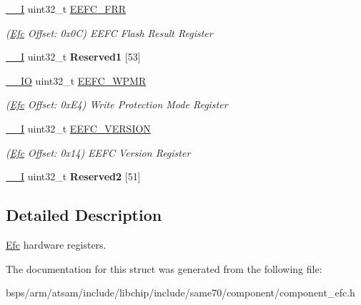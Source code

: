 \begin{DoxyCompactItemize}
\mbox{\label{structEfc_a82c4cb433e72e8bbd32412d06a09beb8}} 
\mbox{\hyperlink{core__cm7_8h_af63697ed9952cc71e1225efe205f6cd3}{\+\_\+\+\_\+I}} uint32\+\_\+t \mbox{\hyperlink{structEfc_a82c4cb433e72e8bbd32412d06a09beb8}{E\+E\+F\+C\+\_\+\+F\+RR}}
\begin{DoxyCompactList}\small\item\em (\mbox{\hyperlink{structEfc}{Efc}} Offset\+: 0x0C) E\+E\+FC Flash Result Register \end{DoxyCompactList}\item 
\mbox{\label{structEfc_a5a67048ca34a108a238d97ef9420f9e2}} 
\mbox{\hyperlink{core__cm7_8h_af63697ed9952cc71e1225efe205f6cd3}{\+\_\+\+\_\+I}} uint32\+\_\+t {\bfseries Reserved1} \mbox{[}53\mbox{]}
\item 
\mbox{\label{structEfc_a84e499108c143fc119dc46fab3ebae5f}} 
\mbox{\hyperlink{core__cm7_8h_aec43007d9998a0a0e01faede4133d6be}{\+\_\+\+\_\+\+IO}} uint32\+\_\+t \mbox{\hyperlink{structEfc_a84e499108c143fc119dc46fab3ebae5f}{E\+E\+F\+C\+\_\+\+W\+P\+MR}}
\begin{DoxyCompactList}\small\item\em (\mbox{\hyperlink{structEfc}{Efc}} Offset\+: 0x\+E4) Write Protection Mode Register \end{DoxyCompactList}\item 
\mbox{\label{structEfc_a1683a46078ca51259ce11efb449397a2}} 
\mbox{\hyperlink{core__cm7_8h_af63697ed9952cc71e1225efe205f6cd3}{\+\_\+\+\_\+I}} uint32\+\_\+t \mbox{\hyperlink{structEfc_a1683a46078ca51259ce11efb449397a2}{E\+E\+F\+C\+\_\+\+V\+E\+R\+S\+I\+ON}}
\begin{DoxyCompactList}\small\item\em (\mbox{\hyperlink{structEfc}{Efc}} Offset\+: 0x14) E\+E\+FC Version Register \end{DoxyCompactList}\item 
\mbox{\label{structEfc_ac75bc599c27f762fdfeb05abc51bf45c}} 
\mbox{\hyperlink{core__cm7_8h_af63697ed9952cc71e1225efe205f6cd3}{\+\_\+\+\_\+I}} uint32\+\_\+t {\bfseries Reserved2} \mbox{[}51\mbox{]}
\end{DoxyCompactItemize}


\subsection{Detailed Description}
\mbox{\hyperlink{structEfc}{Efc}} hardware registers. 

The documentation for this struct was generated from the following file\+:\begin{DoxyCompactItemize}
\item 
bsps/arm/atsam/include/libchip/include/same70/component/component\+\_\+efc.\+h\end{DoxyCompactItemize}
